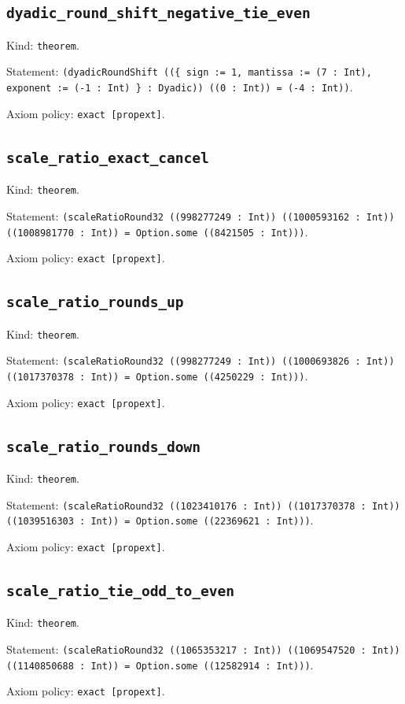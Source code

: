 \documentclass[11pt]{article}
\begin{document}
\subsection*{\texttt{dyadic\_round\_shift\_negative\_tie\_even}}
\noindent Kind: \texttt{theorem}.\par
\noindent Statement: \texttt{(dyadicRoundShift ((\{ sign := 1, mantissa := (7 : Int), exponent := (-1 : Int) \} : Dyadic)) ((0 : Int)) = (-4 : Int))}.\par
\noindent Axiom policy: \texttt{exact [propext]}.\par
\subsection*{\texttt{scale\_ratio\_exact\_cancel}}
\noindent Kind: \texttt{theorem}.\par
\noindent Statement: \texttt{(scaleRatioRound32 ((998277249 : Int)) ((1000593162 : Int)) ((1008981770 : Int)) = Option.some ((8421505 : Int)))}.\par
\noindent Axiom policy: \texttt{exact [propext]}.\par
\subsection*{\texttt{scale\_ratio\_rounds\_up}}
\noindent Kind: \texttt{theorem}.\par
\noindent Statement: \texttt{(scaleRatioRound32 ((998277249 : Int)) ((1000693826 : Int)) ((1017370378 : Int)) = Option.some ((4250229 : Int)))}.\par
\noindent Axiom policy: \texttt{exact [propext]}.\par
\subsection*{\texttt{scale\_ratio\_rounds\_down}}
\noindent Kind: \texttt{theorem}.\par
\noindent Statement: \texttt{(scaleRatioRound32 ((1023410176 : Int)) ((1017370378 : Int)) ((1039516303 : Int)) = Option.some ((22369621 : Int)))}.\par
\noindent Axiom policy: \texttt{exact [propext]}.\par
\subsection*{\texttt{scale\_ratio\_tie\_odd\_to\_even}}
\noindent Kind: \texttt{theorem}.\par
\noindent Statement: \texttt{(scaleRatioRound32 ((1065353217 : Int)) ((1069547520 : Int)) ((1140850688 : Int)) = Option.some ((12582914 : Int)))}.\par
\noindent Axiom policy: \texttt{exact [propext]}.\par
\end{document}
